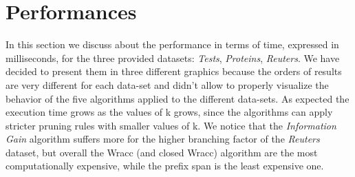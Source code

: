 \documentclass[10pt, a4paper]{article}
\begin{document}
	\section{Performances}
	In this section we discuss about the performance in terms of time, expressed in milliseconds, for the three provided datasets: \textit{Tests}, \textit{Proteins}, \textit{Reuters}. 
	We have decided to present them in three different graphics because the orders of results are very different for each data-set and didn't allow to properly visualize the behavior of the five algorithms applied to the different data-sets.
	As expected the execution time grows as the values of k grows, since the algorithms can apply stricter pruning rules with smaller values of k.\newline
	We notice that the \textit{Information Gain} algorithm suffers more for the higher branching factor of the \textit{Reuters} dataset, but overall the Wracc (and closed Wracc) algorithm are the most computationally expensive, while the prefix span is the least expensive one.
\end{document}
